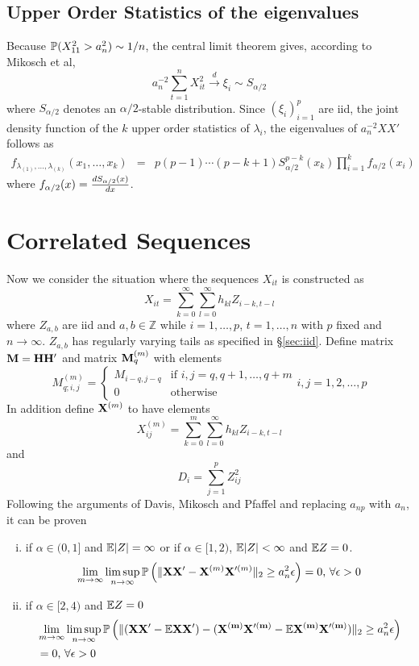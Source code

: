 \documentclass{article}
\begin{document}
\subsection{Upper Order Statistics of the eigenvalues}
Because $\mathbb{P}(X_{11}^2 > a_n^2) \sim 1/n$, the central limit theorem
gives, according to Mikosch et al\cite{Embrechts1997},
\[
a_n^{-2} \sum_{t=1}^n X_{it}^2 \xrightarrow{d} \xi_i \sim S_{\alpha/2}
\]
where $S_{\alpha/2}$ denotes an $\alpha/2$-stable distribution. Since
$(\xi_i)_{i=1}^p$ are iid, the joint density function of the $k$ upper
order statistics of $\lambda_i$, the eigenvalues of $a_n^{-2} X X'$
follows as
\begin{eqnarray*}
  f_{\lambda_{(1)}, \dots, \lambda_{(k)}}(x_1, \dots, x_k) &=&
  p(p-1)\cdots(p-k+1) S_{\alpha/2}^{p-k}(x_k) \prod_{i=1}^k
  f_{\alpha/2}(x_i)
\end{eqnarray*}
where $f_{\alpha/2}(x) = {d S_{\alpha/2}(x) \over dx}$.
\section{Correlated Sequences}
Now we consider the situation where the sequences $X_{it}$ is
constructed as
\[
X_{it} = \sum_{k=0}^{\infty} \sum_{l=0}^{\infty} h_{kl} Z_{i-k, t-l}
\]
where $Z_{a,b}$ are iid and $a,b \in \mathbb{Z}$ while $i=1,\dots,p$,
$t=1,\dots,n$ with $p$ fixed and $n \to \infty$. $Z_{a,b}$ has
regularly varying tails as specified in \S\ref{sec:iid}.
Define matrix $\mathbf{M} = \mathbf{H H'}$ and matrix $\mathbf{M}^{(m)}_q$ with
elements
\[
M^{(m)}_{q; i,j} = \left\{
  \begin{array}{ll}
    M_{i-q, j-q} & \text{if } i,j = q, q+1, \dots, q+m \\
    0 & \text{otherwise}
  \end{array}
\right.
i,j = 1,2,\dots,p
\]
In addition define $\mathbf{X}^{(m)}$ to have elements
\[
X^{(m)}_{ij} = \sum_{k=0}^{m} \sum_{l=0}^{\infty} h_{kl} Z_{i-k, t-l}
\]
and
\[
D_i = \sum_{j=1}^p Z_{ij}^2
\]
Following the arguments of Davis, Mikosch and
Pfaffel\cite{Mikosch2014} and replacing $a_{np}$ with $a_n$, it can be
proven
\begin{enumerate}[i)]
\item if $\alpha \in (0, 1]$ and $\mathbb{E}|Z| = \infty$ or if $\alpha \in
  [1, 2)$, $\mathbb{E}|Z| < \infty$ and $\mathbb{E} Z = 0$.
  \[
  \lim_{m\to \infty} \limsup_{n\to\infty} \mathbb{P}\left(
    \|\mathbf{X X'} - \mathbf{X}^{(m)} \mathbf{X}'^{(m)}\|_2 \geq a_n^2 \epsilon
  \right) = 0 \text{, } \forall \epsilon > 0  
  \]
\item if $\alpha \in [2, 4)$ and $\mathbb{E} Z = 0$
  \begin{align*}
    & \lim_{m\to \infty} \limsup_{n\to\infty} \mathbb{P}\left(
      \|(\mathbf{XX'} - \mathbb{E}\mathbf{XX'}) - (\mathbf{X^{(m)} X'^{(m)}} - \mathbb{E}
      \mathbf{X^{(m)} X'^{(m)}})\|_2 \geq a_n^2 \epsilon \right) \\
    &= 0 \text{, } \forall \epsilon > 0
  \end{align*}
\end{enumerate}
\end{document}
